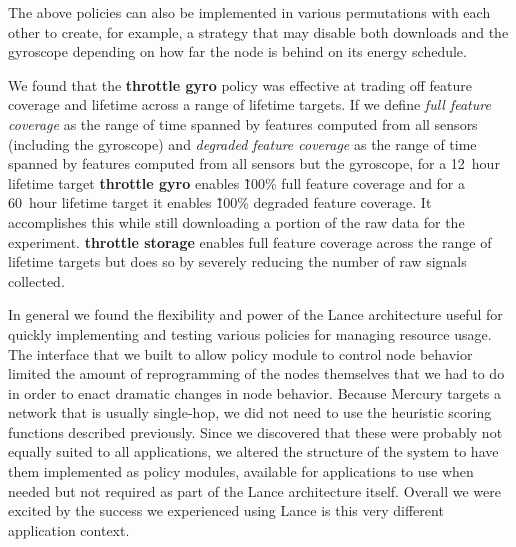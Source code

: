 The above policies can also be implemented in various permutations with each
other to create, for example, a strategy that may disable both downloads and
the gyroscope depending on how far the node is behind on its energy schedule.

We found that the \textbf{throttle gyro} policy was effective at trading off
feature coverage and lifetime across a range of lifetime targets. If we
define \textit{full feature coverage} as the range of time spanned by
features computed from all sensors (including the gyroscope) and
\textit{degraded feature coverage} as the range of time spanned by features
computed from all sensors but the gyroscope, for a 12~hour lifetime target
\textbf{throttle gyro} enables \~100\% full feature coverage and for a
60~hour lifetime target it enables \~100\% degraded feature coverage. It
accomplishes this while still downloading a portion of the raw data for the
experiment. \textbf{throttle storage} enables full feature coverage across
the range of lifetime targets but does so by severely reducing the number of
raw signals collected.

In general we found the flexibility and power of the Lance architecture
useful for quickly implementing and testing various policies for managing
resource usage. The interface that we built to allow policy module to control
node behavior limited the amount of reprogramming of the nodes themselves
that we had to do in order to enact dramatic changes in node behavior.
Because Mercury targets a network that is usually single-hop, we did not need
to use the heuristic scoring functions described previously. Since we
discovered that these were probably not equally suited to all applications,
we altered the structure of the system to have them implemented as policy
modules, available for applications to use when needed but not required as
part of the Lance architecture itself. Overall we were excited by the success
we experienced using Lance is this very different application context.
